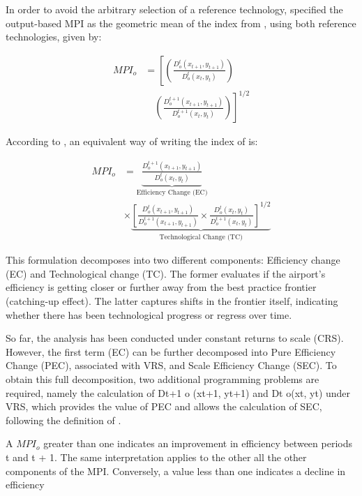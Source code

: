 In order to avoid the arbitrary selection of a reference technology, \cite{fare1994} specified the
output-based MPI as the geometric mean of the index from , using both reference technologies, given by:

\begin{equation}
    \label{eq:MI3}
\begin{aligned}
MPI_{o} &= \left[ \left( \frac{D^{t}_{o}(x_{t+1}, y_{t+1})}{D^{t}_{o}(x_{t}, y_{t})} \right) \right. \\
&\quad \left. \left( \frac{D^{t+1}_{o}(x_{t+1}, y_{t+1})}{D^{t+1}_{o}(x_{t}, y_{t})} \right) \right]^{1/2}
\end{aligned}
\end{equation}

According to \cite{fare1994},  an equivalent way of writing the index of  is:


\begin{equation}
\label{eq:MPI}
\begin{aligned}
MPI_{o} &= \underbrace{\frac{D^{t+1}_{o}(x_{t+1}, y_{t+1})}{D^{t}_{o}(x_{t}, y_{t})}}_{\text{Efficiency Change (EC)}} \\
&\times \underbrace{\left[ 
\frac{D^{t}_{o}(x_{t+1}, y_{t+1})}{D^{t+1}_{o}(x_{t+1}, y_{t+1})} 
\times 
\frac{D^{t}_{o}(x_{t}, y_{t})}{D^{t+1}_{o}(x_{t}, y_{t})} 
\right]^{1/2}}_{\text{Technological Change (TC)}}
\end{aligned}
\end{equation}


This formulation decomposes  into two different components: Efficiency change (EC)
and Technological change (TC). The former evaluates if the airport’s efficiency is getting closer or further
away from the best practice frontier (catching-up effect). The latter captures shifts in the frontier itself,
indicating whether there has been technological progress or regress over time.

So far, the analysis has been conducted under constant returns to scale (CRS). However, the first
term (EC) can be further decomposed into Pure Efficiency Change (PEC), associated with VRS, and
Scale Efficiency Change (SEC). To obtain this full decomposition, two additional programming problems are required, namely the
calculation of Dt+1
o
(xt+1, yt+1) and Dt
o(xt, yt) under VRS, which provides the value of PEC and allows
the calculation of SEC, following the definition of . 

A $MPI_{o}$ greater than one indicates an improvement in efficiency between periods t and t + 1. The
same interpretation applies to the other all the other components of the MPI. Conversely, a value less
than one indicates a decline in efficiency